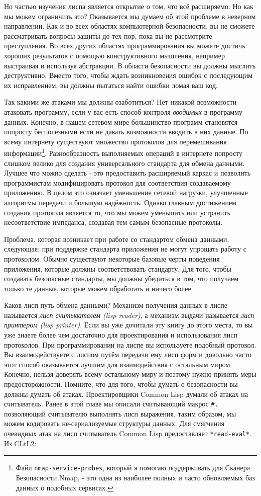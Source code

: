 Но частью изучения лиспа является открытие о том, что всё расширяемо. Но как мы можем ограничить это? Оказывается мы думаем об этой проблеме в неверном направлении. Как и во всех областях компьютерной безопасности, вы не сможете рассматривать вопросы защиты до тех пор, пока вы не рассмотрите преступления. Во всех других областях программирования вы можете достичь хороших результатов с помощью конструктивного мышления, например выстраивая и используя абстракции. В области безопасности вы должны мыслить деструктивно. Вместо того, чтобы ждать возникновения ошибок с последующим их исправлением, вы должны пытаться найти ошибки ломая ваш код.

Так какими же атаками мы должны озаботиться? Нет никакой возможности атаковать программу, если у вас есть способ контроля \emph{вводимых} в программу данных. Конечно, в нашем сетевом мире большинство программ становятся попросту бесполезными если не давать возможности вводить в них данные. По всему интернету существуют множество протоколов для перемешивания информации\footnote{Файл \verb"nmap-service-probes", который я помогаю поддерживать для Сканера Безопасности Nmap, - это одна из наиболее полных и часто обновляемых баз данных о подобных сервисах.}. Разнообразность выполняемых операций в интернете попросту слишком велико для создания универсального стандарта для обмена данными. Лучшее что можно сделать - это предоставить расширяемый каркас и позволить программистам модифицировать протокол для соответствия создаваемому приложению. В целом это означает уменьшение сетевой нагрузки, улучшенные алгоритмы передачи и большую надёжность. Однако главным достижением создания протокола является то, что мы можем уменьшить или устранить несоответствие импеданса, создавая тем самым безопасные протоколы.

Проблема, которая возникает при работе со стандартом обмена данными, следующая: при поддержке стандарта приложения не могут упрощать работу с протоколом. Обычно существуют некоторые базовые черты поведения приложения, которые должны соответствовать стандарту. Для того, чтобы создавать безопасные стандарты, мы должны убедиться в том, что получаем только те данные, которые можем обработать и ничего более.

Каков лисп путь обмена данными? Механизм получения данных в лиспе называется \emph{лисп считывателем (lisp reader)}, а механизм выдачи называется \emph{лисп принтером (lisp printer)}. Если вы уже дочитали эту книгу до этого места, то вы уже знаете более чем достаточно для проектирования и использования лисп протоколов. При программировании на лиспе вы используете подобный протокол. Вы взаимодействуете с лиспом путём передачи ему лисп форм и довольно часто этот способ оказывается лучшим для взаимодействия с остальным миром. Конечно, нельзя доверять всему остальному миру и поэтому нужно принять меры предосторожности. Помните, что для того, чтобы думать о безопасности вы должны думать об атаках. Проектировщики Common Lisp думали об атаках на считыватель. Ранее в этой главе мы описали считывающий макрос \verb"#." позволяющий считывателю выполнять лисп выражения, таким образом, мы можем кодировать не-сериализуемые структуры данных. Для смягчения очевидных атак на лисп считыватель Common Lisp предоставляет \verb"*read-eval*". Из CLtL2:

